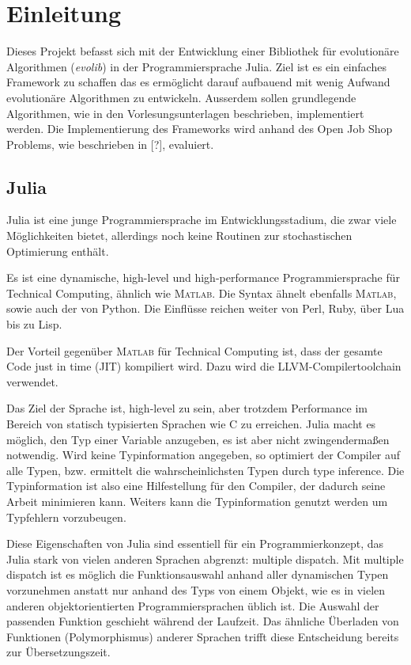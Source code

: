 \section{Einleitung}\label{einleitung}

Dieses Projekt befasst sich mit der Entwicklung einer Bibliothek für evolutionäre Algorithmen (\textit{evolib}) in der Programmiersprache Julia. 
Ziel ist es ein einfaches Framework zu schaffen das es ermöglicht darauf aufbauend mit wenig Aufwand evolutionäre Algorithmen zu entwickeln. 
Ausserdem sollen grundlegende Algorithmen, wie in den Vorlesungsunterlagen beschrieben, implementiert werden.
Die Implementierung des Frameworks wird anhand des Open Job Shop Problems, wie beschrieben in [?], evaluiert. 

\subsection{Julia}
Julia ist eine junge Programmiersprache im Entwicklungsstadium, die zwar viele Möglichkeiten bietet, allerdings noch keine Routinen zur stochastischen Optimierung enthält.

Es ist eine dynamische, high-level und high-performance Programmiersprache für Technical Computing, ähnlich wie \textsc{Matlab}. Die Syntax ähnelt ebenfalls \textsc{Matlab}, sowie auch der von Python. 
Die Einflüsse reichen weiter von Perl, Ruby, über Lua bis zu Lisp.

Der Vorteil gegenüber \textsc{Matlab} für Technical Computing ist, dass der gesamte Code just in time (JIT) kompiliert wird. 
Dazu wird die LLVM-Compilertoolchain verwendet.

Das Ziel der Sprache ist, high-level zu sein, aber trotzdem Performance im Bereich von statisch typisierten Sprachen wie C zu erreichen. 
Julia macht es möglich, den Typ einer Variable anzugeben, es ist aber nicht zwingendermaßen notwendig.
Wird keine Typinformation angegeben, so optimiert der Compiler auf alle Typen, bzw. ermittelt die wahrscheinlichsten Typen durch type inference.
Die Typinformation ist also eine Hilfestellung für den Compiler, der dadurch seine Arbeit minimieren kann. 
Weiters kann die Typinformation genutzt werden um Typfehlern vorzubeugen.

Diese Eigenschaften von Julia sind essentiell für ein Programmierkonzept, das Julia stark von vielen anderen Sprachen abgrenzt: multiple dispatch.
Mit multiple dispatch ist es möglich die Funktionsauswahl anhand aller dynamischen Typen vorzunehmen anstatt nur anhand des Typs von einem Objekt, wie es in vielen anderen objektorientierten Programmiersprachen üblich ist. 
Die Auswahl der passenden Funktion geschieht während der Laufzeit. 
Das ähnliche Überladen von Funktionen (Polymorphismus) anderer Sprachen trifft diese Entscheidung bereits zur Übersetzungszeit.


